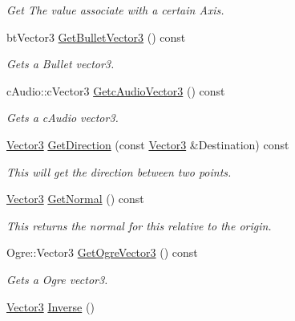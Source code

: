 \begin{DoxyCompactItemize}
\begin{DoxyCompactList}\small\item\em Get The value associate with a certain Axis. \item\end{DoxyCompactList}\item 
btVector3 \hyperlink{classMezzanine_1_1Vector3_ab9fb84bdbfe3bed9fd210a6ad1cee8b7}{GetBulletVector3} () const 
\begin{DoxyCompactList}\small\item\em Gets a Bullet vector3. \item\end{DoxyCompactList}\item 
cAudio::cVector3 \hyperlink{classMezzanine_1_1Vector3_abc23c3ed5b31db10992744bf789eb390}{GetcAudioVector3} () const 
\begin{DoxyCompactList}\small\item\em Gets a cAudio vector3. \item\end{DoxyCompactList}\item 
\hyperlink{classMezzanine_1_1Vector3}{Vector3} \hyperlink{classMezzanine_1_1Vector3_a707fd0329426f74b38b58d081c585eae}{GetDirection} (const \hyperlink{classMezzanine_1_1Vector3}{Vector3} \&Destination) const 
\begin{DoxyCompactList}\small\item\em This will get the direction between two points. \item\end{DoxyCompactList}\item 
\hyperlink{classMezzanine_1_1Vector3}{Vector3} \hyperlink{classMezzanine_1_1Vector3_a8683a3d640736b5dda63be4a656663a3}{GetNormal} () const 
\begin{DoxyCompactList}\small\item\em This returns the normal for this relative to the origin. \item\end{DoxyCompactList}\item 
Ogre::Vector3 \hyperlink{classMezzanine_1_1Vector3_a2948167508c456d64032acfc8c2f6fd8}{GetOgreVector3} () const 
\begin{DoxyCompactList}\small\item\em Gets a Ogre vector3. \item\end{DoxyCompactList}\item 
\hyperlink{classMezzanine_1_1Vector3}{Vector3} \hyperlink{classMezzanine_1_1Vector3_a99846b5e24df4d20391465cf321d3a6c}{Inverse} ()

\end{DoxyCompactItemize}
